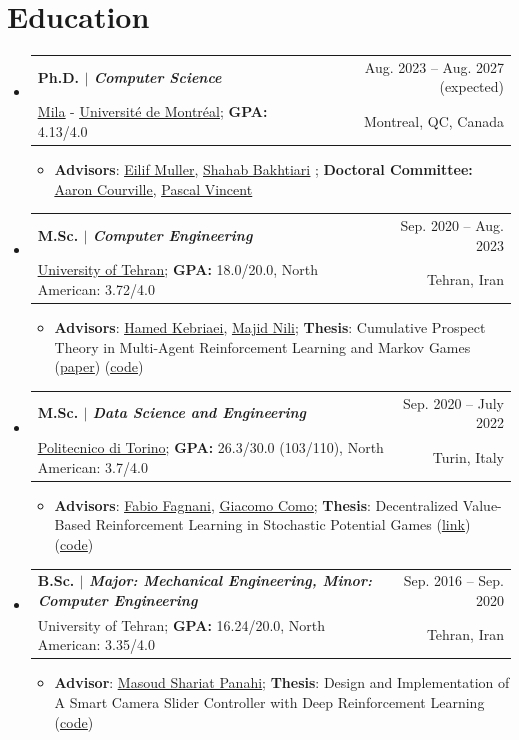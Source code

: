 \documentclass[a4paper,11pt]{article}
\makeatletter
\newcommand{\CVItem}[1]{
  \item\small{
    {#1 \vspace{-2pt}}
  }
}
\newcommand{\CVSubheading}[4]{
  \vspace{-2pt}\item
    \begin{tabular*}{0.97\textwidth}[t]{l@{\extracolsep{\fill}}r}
      \textbf{#1} & #2 \\
      \small#3 & \small #4 \\
    \end{tabular*}\vspace{-7pt}
}
\newcommand{\CVSubHeadingListStart}{\begin{itemize}[leftmargin=0.5cm, label={}]}
\newcommand{\CVSubHeadingListEnd}{\end{itemize}}
\newcommand{\CVItemListStart}{\begin{itemize}}
\newcommand{\CVItemListEnd}{\end{itemize}\vspace{-5pt}}
\makeatother
\begin{document}
\section{Education}
  \CVSubHeadingListStart
    \CVSubheading
      {{Ph.D. $|$ \emph{Computer Science}}}{Aug. 2023 -- Aug. 2027 (expected)}
      {\href{https://mila.quebec/en/}{\underline{Mila}} - \href{https://diro.umontreal.ca/english/home/}{\underline{Université de Montréal}}; \textbf{GPA:} 4.13/4.0}{Montreal, QC, Canada}
      \CVItemListStart
        \CVItem{\textbf{Advisors}: \href{https://scholar.google.ch/citations?user=r4-NZhwAAAAJ&hl=en}{\underline{Eilif Muller}},
        \href{https://scholar.google.com/citations?user=f_JDOhEAAAAJ&hl=en}{\underline{Shahab Bakhtiari}}
        ; \textbf{Doctoral Committee:} \href{https://scholar.google.com/citations?hl=en&user=km6CP8cAAAAJ&view_op=list_works}{\underline{Aaron Courville}},
        \href{https://scholar.google.com/citations?hl=en&user=WBCKQMsAAAAJ&view_op=list_works}{\underline{Pascal Vincent}}}
      \CVItemListEnd
    \CVSubheading
      {{M.Sc. $|$ \emph{Computer Engineering}}}{Sep. 2020 -- Aug. 2023}
      {\href{https://ut.ac.ir/en}{\underline{University of Tehran}}; \textbf{GPA:} 18.0/20.0, North American: 3.72/4.0}{Tehran, Iran}
      \CVItemListStart
        \CVItem{\textbf{Advisors}: \href{https://scholar.google.com/citations?user=eDseLNYAAAAJ&hl=en}{\underline{Hamed Kebriaei}},
        \href{https://scholar.google.com/citations?user=QlwWxmoAAAAJ&hl=en}{\underline{Majid Nili}}; \textbf{Thesis}: Cumulative Prospect Theory in Multi-Agent Reinforcement Learning and Markov Games
        	(\href{https://arxiv.org/abs/2402.05906}{\underline{paper}}) (\href{https://github.com/hafezgh/risk-sensitive-marl-namg}{\underline{code}})}
      \CVItemListEnd
    \CVSubheading
      {{M.Sc. $|$ \emph{\small{Data Science and Engineering}}}}{Sep. 2020 -- July 2022}
      {\href{https://www.polito.it/en?lang=en}{\underline{Politecnico di Torino}}; \textbf{GPA:} 26.3/30.0 (103/110), North American: 3.7/4.0}{Turin, Italy}
      \CVItemListStart
        \CVItem{\textbf{Advisors}: \href{https://scholar.google.com/citations?user=oqwlDQEAAAAJ&hl=en}{\underline{Fabio Fagnani}},
        \href{https://scholar.google.com/citations?user=7dju3QoAAAAJ&hl=en}{\underline{Giacomo Como}}; \textbf{Thesis}: Decentralized Value-Based Reinforcement Learning in Stochastic Potential Games (\href{https://webthesis.biblio.polito.it/23450/}{\underline{link}}) (\href{https://github.com/hafezgh/PoliTo-MSc-Thesis}{\underline{code}})}
      \CVItemListEnd
    \CVSubheading
      {{B.Sc. $|$ \emph{\small{Major: Mechanical Engineering, Minor: Computer Engineering}}}}{Sep. 2016 -- Sep. 2020}
      {{University of Tehran}; \textbf{GPA:} 16.24/20.0, North American: 3.35/4.0}{Tehran, Iran}
    \CVItemListStart
        \CVItem{\textbf{Advisor}: \href{https://scholar.google.com/citations?user=UwlyBw0AAAAJ&hl=en}{\underline{Masoud Shariat Panahi}}; \textbf{Thesis}: Design and Implementation of A Smart Camera Slider Controller with Deep Reinforcement Learning (\href{https://github.com/hafezgh/bahcelor_thesis}{\underline{code}})}
    \CVItemListEnd
  \CVSubHeadingListEnd
\end{document}
